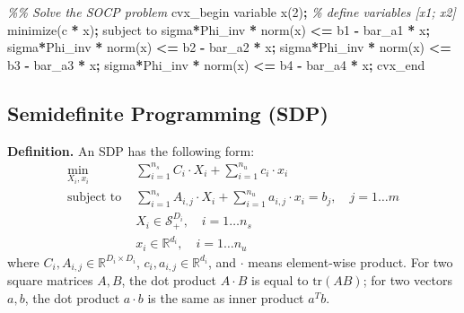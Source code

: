 \documentclass[
]{book}
\newenvironment{Shaded}{\begin{snugshade}}{\end{snugshade}}
\newcommand{\CommentTok}[1]{\textcolor[rgb]{0.56,0.35,0.01}{\textit{#1}}}
\newcommand{\FloatTok}[1]{\textcolor[rgb]{0.00,0.00,0.81}{#1}}
\newcommand{\NormalTok}[1]{#1}
\newcommand{\OperatorTok}[1]{\textcolor[rgb]{0.81,0.36,0.00}{\textbf{#1}}}
\newcommand{\VariableTok}[1]{\textcolor[rgb]{0.00,0.00,0.00}{#1}}
\theoremstyle{definition}
\theoremstyle{definition}
\theoremstyle{definition}
\theoremstyle{definition}
\theoremstyle{remark}
\begin{document}
\begin{Shaded}
\begin{Highlighting}[]
\CommentTok{\%\% Solve the SOCP problem}
\VariableTok{cvx\_begin}
    \VariableTok{variable} \VariableTok{x}\NormalTok{(}\FloatTok{2}\NormalTok{)}\OperatorTok{;} \CommentTok{\% define variables [x1; x2]}
    \VariableTok{minimize}\NormalTok{(}\VariableTok{c}\OperatorTok{\textquotesingle{}} \OperatorTok{*} \VariableTok{x}\NormalTok{)}\OperatorTok{;} 
    \VariableTok{subject} \VariableTok{to}
        \VariableTok{sigma}\OperatorTok{*}\VariableTok{Phi\_inv} \OperatorTok{*} \VariableTok{norm}\NormalTok{(}\VariableTok{x}\NormalTok{) }\OperatorTok{\textless{}=} \VariableTok{b1} \OperatorTok{{-}} \VariableTok{bar\_a1}\OperatorTok{\textquotesingle{}} \OperatorTok{*} \VariableTok{x}\OperatorTok{;}
        \VariableTok{sigma}\OperatorTok{*}\VariableTok{Phi\_inv} \OperatorTok{*} \VariableTok{norm}\NormalTok{(}\VariableTok{x}\NormalTok{) }\OperatorTok{\textless{}=} \VariableTok{b2} \OperatorTok{{-}} \VariableTok{bar\_a2}\OperatorTok{\textquotesingle{}} \OperatorTok{*} \VariableTok{x}\OperatorTok{;}
        \VariableTok{sigma}\OperatorTok{*}\VariableTok{Phi\_inv} \OperatorTok{*} \VariableTok{norm}\NormalTok{(}\VariableTok{x}\NormalTok{) }\OperatorTok{\textless{}=} \VariableTok{b3} \OperatorTok{{-}} \VariableTok{bar\_a3}\OperatorTok{\textquotesingle{}} \OperatorTok{*} \VariableTok{x}\OperatorTok{;}
        \VariableTok{sigma}\OperatorTok{*}\VariableTok{Phi\_inv} \OperatorTok{*} \VariableTok{norm}\NormalTok{(}\VariableTok{x}\NormalTok{) }\OperatorTok{\textless{}=} \VariableTok{b4} \OperatorTok{{-}} \VariableTok{bar\_a4}\OperatorTok{\textquotesingle{}} \OperatorTok{*} \VariableTok{x}\OperatorTok{;}
\VariableTok{cvx\_end}
\end{Highlighting}
\end{Shaded}

\subsection{Semidefinite Programming (SDP)}\label{semidefinite-programming-sdp}

\textbf{Definition.} An SDP has the following form:
\begin{align}
   \label{eq:app-sdpdef}
   \min_{X_i, x_i} \ & \sum_{i=1}^{n_s} C_i \cdot X_i + \sum_{i=1}^{n_u} c_i \cdot x_i \\
   \text{subject to } & \sum_{i=1}^{n_s} A_{i,j} \cdot X_i + \sum_{i=1}^{n_u} a_{i,j} \cdot x_i = b_j, \quad j = 1 \dots m \\
   & X_i \in \mathcal{S}_+^{D_i}, \quad i = 1 \dots n_s \\
   & x_i \in \mathbb{R}^{d_i}, \quad i = 1 \dots n_u  
\end{align}
where \(C_i, A_{i, j} \in \mathbb{R}^{D_i \times D_i}\), \(c_i, a_{i, j} \in \mathbb{R}^{d_i}\), and \(\cdot\) means element-wise product. For two square matrices \(A, B\), the dot product \(A \cdot B\) is equal to \(\text{tr}(A B)\); for two vectors \(a, b\), the dot product \(a \cdot b\) is the same as inner product \(a^T b\).
\end{document}
